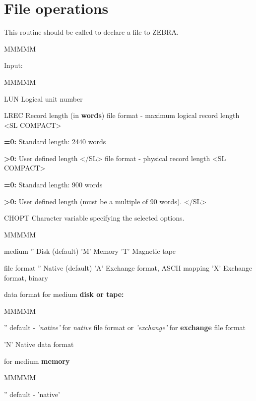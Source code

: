 \section{File operations}
\par This routine should be called to declare a file to ZEBRA.
\begin{DL}{MMMMM}
\item[Input:
]
\begin{DL}{MMMMM}
\item[LUN
]Logical unit number
\item[LREC
]Record length (in {\bf words})
 file format - maximum logical record length
<SL COMPACT>
\item {\bf =0:} Standard length: 2440 words
\item {\bf >0:} User defined length
</SL>
 file format - physical record length
<SL COMPACT>
\item {\bf =0:} Standard length: 900 words
\item {\bf >0:} User defined length (must be a multiple of 90 words).
</SL>
\item[CHOPT
]Character variable specifying the selected options.
\begin{DL}{MMMMM}
\item[medium
]'' Disk (default)
\newline 'M' Memory
\newline 'T' Magnetic tape
\item[file format
]'' Native (default)
\newline 'A' Exchange format, ASCII mapping
\newline 'X' Exchange format, binary
\item[data format
]for medium {\bf disk or tape:}
\begin{DL}{MMMMM}
\item[''
]default - {\it 'native'} for {\it native} file format
\newline    or    {\it 'exchange'} for {\bf exchange} file format
\item['N'
]Native data format
\end{DL}
\newline for medium {\bf memory}
\begin{DL}{MMMMM}
\item[''
]default - 'native'

\end{DL}
\end{DL}
\end{DL}
\end{DL}
